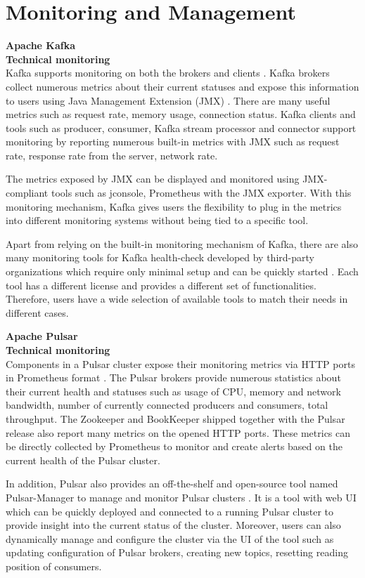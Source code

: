 \section{Monitoring and Management}
\large \textbf{Apache Kafka}\\
\normalsize
\textbf{Technical monitoring}\\
Kafka supports monitoring on both the brokers and clients \cite{kafkamonitoring}. Kafka brokers collect numerous metrics about their current statuses and expose this information to users using Java Management Extension (JMX) \cite{java2006monitoring}. There are many useful metrics such as request rate, memory usage, connection status. Kafka clients and tools such as producer, consumer, Kafka stream processor and connector support monitoring by reporting numerous built-in metrics with JMX such as request rate, response rate from the server, network rate. 

The metrics exposed by JMX can be displayed and monitored using JMX-compliant tools such as jconsole, Prometheus with the JMX exporter. With this monitoring mechanism, Kafka gives users the flexibility to plug in the metrics into different monitoring systems without being tied to a specific tool. 

Apart from relying on the built-in monitoring mechanism of Kafka, there are also many monitoring tools for Kafka health-check developed by third-party organizations which require only minimal setup and can be quickly started \cite{kafkamonitoringtools1}. Each tool has a different license and provides a different set of functionalities. Therefore, users have a wide selection of available tools to match their needs in different cases.

\large \textbf{Apache Pulsar}\\
\normalsize
\textbf{Technical monitoring}\\
Components in a Pulsar cluster expose their monitoring metrics via HTTP ports in Prometheus format \cite{pulsarmetrics}. The Pulsar brokers provide numerous statistics about their current health and statuses such as usage of CPU, memory and network bandwidth, number of currently connected producers and consumers, total throughput. The Zookeeper and BookKeeper shipped together with the Pulsar release also report many metrics on the opened HTTP ports.
These metrics can be directly collected by Prometheus to monitor and create alerts based on the current health of the Pulsar cluster. 

In addition, Pulsar also provides an off-the-shelf and open-source tool named Pulsar-Manager to manage and monitor Pulsar clusters \cite{pulsarmanager}. It is a tool with web UI which can be quickly deployed and connected to a running Pulsar cluster to provide insight into the current status of the cluster. Moreover, users can also dynamically manage and configure the cluster via the UI of the tool such as updating configuration of Pulsar brokers, creating new topics, resetting reading position of consumers.

